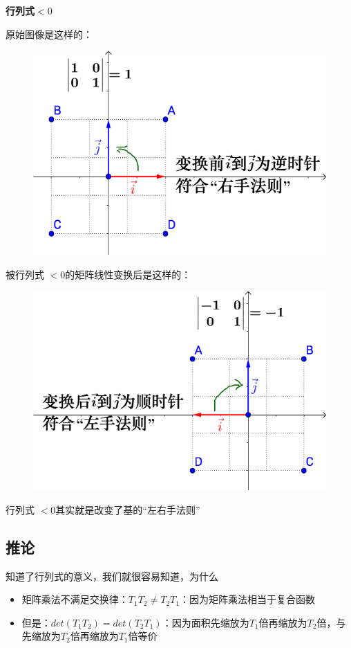 \documentclass[12pt]{article}
\begin{document}
\begin{framed}  
\textbf{行列式$<0$}

原始图像是这样的：
\begin{figure}[H]
\centering
\includegraphics[width=.5\textwidth]{fig/UnderstandDeterminant_1.png}
\end{figure}

被行列式 $< 0$的矩阵线性变换后是这样的：
\begin{figure}[H]
\centering
\includegraphics[width=.5\textwidth]{fig/UnderstandDeterminant_2.png}
\end{figure}

行列式 $< 0$其实就是改变了基的“左右手法则”
\end{framed}

\subsection{推论}
知道了行列式的意义，我们就很容易知道，为什么
\begin{itemize}
    \item 矩阵乘法不满足交换律：$T_1T_2 \neq T_2T_1$：因为矩阵乘法相当于复合函数
    \item 但是：$det(T_1T_2) = det(T_2T_1)$：因为面积先缩放为$T_1$倍再缩放为$T_2$倍，与先缩放为$T_2$倍再缩放为$T_1$倍等价
\end{itemize}
\end{document}
